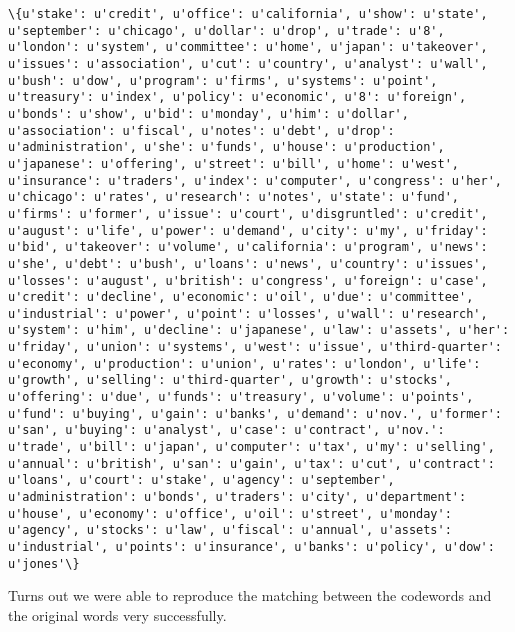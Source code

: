 \documentclass{article}
\begin{document}
    \begin{Verbatim}[commandchars=\\\{\}]
\{u'stake': u'credit', u'office': u'california', u'show': u'state', u'september': u'chicago', u'dollar': u'drop', u'trade': u'8', u'london': u'system', u'committee': u'home', u'japan': u'takeover', u'issues': u'association', u'cut': u'country', u'analyst': u'wall', u'bush': u'dow', u'program': u'firms', u'systems': u'point', u'treasury': u'index', u'policy': u'economic', u'8': u'foreign', u'bonds': u'show', u'bid': u'monday', u'him': u'dollar', u'association': u'fiscal', u'notes': u'debt', u'drop': u'administration', u'she': u'funds', u'house': u'production', u'japanese': u'offering', u'street': u'bill', u'home': u'west', u'insurance': u'traders', u'index': u'computer', u'congress': u'her', u'chicago': u'rates', u'research': u'notes', u'state': u'fund', u'firms': u'former', u'issue': u'court', u'disgruntled': u'credit', u'august': u'life', u'power': u'demand', u'city': u'my', u'friday': u'bid', u'takeover': u'volume', u'california': u'program', u'news': u'she', u'debt': u'bush', u'loans': u'news', u'country': u'issues', u'losses': u'august', u'british': u'congress', u'foreign': u'case', u'credit': u'decline', u'economic': u'oil', u'due': u'committee', u'industrial': u'power', u'point': u'losses', u'wall': u'research', u'system': u'him', u'decline': u'japanese', u'law': u'assets', u'her': u'friday', u'union': u'systems', u'west': u'issue', u'third-quarter': u'economy', u'production': u'union', u'rates': u'london', u'life': u'growth', u'selling': u'third-quarter', u'growth': u'stocks', u'offering': u'due', u'funds': u'treasury', u'volume': u'points', u'fund': u'buying', u'gain': u'banks', u'demand': u'nov.', u'former': u'san', u'buying': u'analyst', u'case': u'contract', u'nov.': u'trade', u'bill': u'japan', u'computer': u'tax', u'my': u'selling', u'annual': u'british', u'san': u'gain', u'tax': u'cut', u'contract': u'loans', u'court': u'stake', u'agency': u'september', u'administration': u'bonds', u'traders': u'city', u'department': u'house', u'economy': u'office', u'oil': u'street', u'monday': u'agency', u'stocks': u'law', u'fiscal': u'annual', u'assets': u'industrial', u'points': u'insurance', u'banks': u'policy', u'dow': u'jones'\}
    \end{Verbatim}

    Turns out we were able to reproduce the matching between the codewords
and the original words very successfully.
\end{document}
